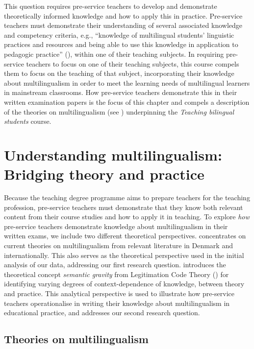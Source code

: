 \documentclass[output=paper]{langscibook}
\begin{document}
This question requires pre-service teachers to develop and demonstrate theoretically informed knowledge and how to apply this in practice. Pre-service teachers must demonstrate their understanding of several associated knowledge and competency criteria, e.g., “knowledge of multilingual students’ linguistic practices and resources and being able to use this knowledge in application to pedagogic practice” (\citealt{MinistryHigherEducationScience2020}), within one of their teaching subjects. In requiring pre-service teachers to focus on one of their teaching subjects, this course compels them to focus on the teaching of that subject, incorporating their knowledge about multilingualism in order to meet the learning needs of multilingual learners in mainstream classrooms. How pre-service teachers demonstrate this in their written examination papers is the focus of this chapter and compels a description of the theories on multilingualism (see ) underpinning the \textit{Teaching bilingual students} course.

\section{Understanding multilingualism: Bridging theory and practice}

Because the teaching degree programme aims to prepare teachers for the teaching profession, pre-service teachers must demonstrate that they know both relevant content from their course studies and how to apply it in teaching. To explore \textit{how} pre-service teachers demonstrate knowledge about multilingualism in their written exams, we include two different theoretical perspectives.  concentrates on current theories on multilingualism from relevant literature in Denmark and internationally. This also serves as the theoretical perspective used in the initial analysis of our data, addressing our first research question.  introduces the theoretical concept \textit{semantic gravity} from Legitimation Code Theory (\citealt{Maton2014}) for identifying varying degrees of context-dependence of knowledge, between theory and practice. This analytical perspective is used to illustrate how pre-service teachers operationalise in writing their knowledge about multilingualism in educational practice, and addresses our second research question.

\subsection{Theories on multilingualism}\label{sec:ostergaard:3.1}
\end{document}
